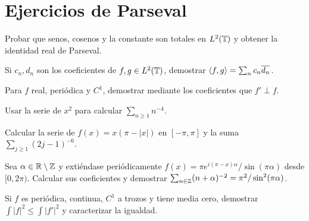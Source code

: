 \section{Ejercicios de Parseval}
\begin{ejercicio}\label{ej:v4-l06-1}
Probar que senos, cosenos y la constante son totales en $L^2(\mathbb T)$ y obtener la identidad real de Parseval.
\end{ejercicio}

\begin{ejercicio}\label{ej:v4-l06-2}
Si $c_n,d_n$ son los coeficientes de $f,g\in L^2(\mathbb T)$, demostrar $\left\langle f,g\right\rangle=\sum_n c_n\overline{d_n}$.
\end{ejercicio}

\begin{ejercicio}\label{ej:v4-l06-3}
Para $f$ real, periódica y $C^1$, demostrar mediante los coeficientes que $f'\perp f$.
\end{ejercicio}

\begin{ejercicio}\label{ej:v4-l06-4}
Usar la serie de $x^2$ para calcular $\sum_{n\geq1}n^{-4}$.
\end{ejercicio}

\begin{ejercicio}\label{ej:v4-l06-5}
Calcular la serie de $f(x)=x(\pi-|x|)$ en $[-\pi,\pi]$ y la suma $\sum_{j\geq1}(2j-1)^{-6}$.
\end{ejercicio}

\begin{ejercicio}\label{ej:v4-l06-6}
Sea $\alpha\in\mathbb R\setminus\mathbb Z$ y extiéndase periódicamente $f(x)=\pi e^{i(\pi-x)\alpha}/\sin(\pi\alpha)$ desde $[0,2\pi)$. Calcular sus coeficientes y demostrar $\sum_{n\in\mathbb Z}(n+\alpha)^{-2}=\pi^2/\sin^2(\pi\alpha)$.
\end{ejercicio}

\begin{ejercicio}\label{ej:v4-l06-7}
Si $f$ es periódica, continua, $C^1$ a trozos y tiene media cero, demostrar $\int|f|^2\leq\int|f'|^2$ y caracterizar la igualdad.
\end{ejercicio}


